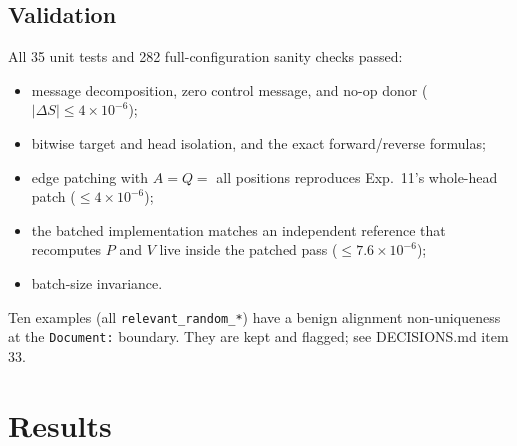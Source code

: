 \documentclass[11pt]{article}
\begin{document}
\subsection{Validation}
All 35 unit tests and 282 full-configuration sanity checks passed:
\begin{itemize}[nosep]
\item message decomposition, zero control message, and no-op donor
  ($|\Delta S|\le 4\times10^{-6}$);
\item bitwise target and head isolation, and the exact forward/reverse
  formulas;
\item edge patching with $A=Q=$ all positions reproduces Exp.~11's
  whole-head patch ($\le 4\times10^{-6}$);
\item the batched implementation matches an independent reference that
  recomputes $P$ and $V$ live inside the patched pass
  ($\le 7.6\times10^{-6}$);
\item batch-size invariance.
\end{itemize}
Ten examples (all \texttt{relevant\_random\_*}) have a benign alignment
non-uniqueness at the \texttt{Document:} boundary. They are kept and flagged;
see DECISIONS.md item 33.

\section{Results}
\end{document}
